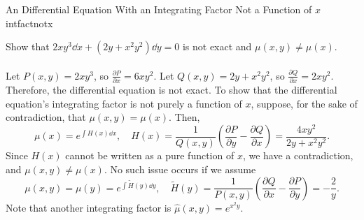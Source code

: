         \begin{example}{An Differential Equation With an Integrating Factor Not a Function of \(x\)}{intfactnotx}
            
            Show that \(2xy^3\dd x+(2y+x^2y^2)\dd y=0\) is not exact and \(\mu(x,y)\neq\mu(x)\).
            \\
            \\
            Let \(P(x,y)=2xy^3\), so \(\frac{\partial P}{\partial x}=6xy^2\). Let \(Q(x,y)=2y+x^2y^2\), so \(\frac{\partial Q}{\partial x}=2xy^2\). Therefore, the differential equation is not exact. To show that the differential equation's integrating factor is not purely a function of \(x\), suppose, for the sake of contradiction, that \(\mu(x,y)=\mu(x)\). Then,
            \begin{equation*}
                \mu(x)=e^{\int H(x)\dd x},\quad H(x)=\frac{1}{Q(x,y)}\left(\frac{\partial P}{\partial y}-\frac{\partial Q}{\partial x}\right)=\frac{4xy^2}{2y+x^2y^2}.
            \end{equation*}
            Since \(H(x)\) cannot be written as a pure function of \(x\), we have a contradiction, and \(\mu(x,y)\neq\mu(x)\). No such issue occurs if we assume 
            \begin{equation*}
                \mu(x,y)=\mu(y)=e^{\int \tilde{H}(y)\dd y}, \quad \tilde{H}(y)=\frac{1}{P(x,y)}\left(\frac{\partial Q}{\partial x}-\frac{\partial P}{\partial y}\right)=-\frac{2}{y}.
            \end{equation*}
            Note that another integrating factor is \(\hat{\mu}(x,y)=e^{x^2y}\).

        \end{example}
